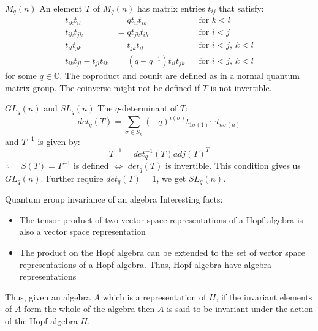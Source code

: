 \documentclass[pdf,colorBG,slideColor,fyma]{prosper}
\def\IC{\mathbb{C}}
\begin{document}
\begin{slide}{$M_q(n)$}
An element $T$ of $M_q(n)$ has matrix entries $t_{ij}$ that satisfy:
\begin{align*}
t_{ik} t_{il} & = q t_{il} t_{ik} & &\text{for $k < l$} \\
t_{ik} t_{jk} & = q t_{jk} t_{ik} & &\text{for $i < j$} \\
t_{il} t_{jk} & = t_{jk} t_{il} & &\text{for $i  < j$, $k < l$} \\
t_{ik} t_{jl} - t_{jl} t_{ik} & = (q - q^{-1}) t_{il} t_{jk} & &\text{for $i  < j$, $k < l$}
\end{align*}
for some $q \in \IC$.
\break
\break
The coproduct and counit are defined as in a normal quantum matrix group.
\break
\break
The coinverse might not be defined if $T$ is not invertible.

\end{slide}


\begin{slide}{$GL_q(n)$ and $SL_q(n)$}
The $q$-determinant of $T$:
\[
det_q(T) = \sum_{\sigma \in S_n} (-q)^{i(\sigma)} t_{1\sigma(1)} \cdots t_{n\sigma(n)}
\]
and $T^{-1}$ is given by:
\[
T^{-1} = det_q^{-1}(T) adj(T)^T
\]
$\therefore\quad$ $S(T) = T^{-1}$ is defined $\Leftrightarrow$ $det_q(T)$ is invertible.
\break
\break
This condition gives us $GL_q(n)$.
\break
\break
Further require $det_q(T) = 1$, we get $SL_q(n)$.
\end{slide}


\begin{slide}{Quantum group invariance of an algebra}
Interesting facts:
\begin{itemize}
  \item{The tensor product of two vector space representations of a Hopf algebra is also
    a vector space representation}
  \item{The product on the Hopf algebra can be extended to the set of vector space
    representations of a Hopf algebra. Thus, Hopf algebra have algebra representations}
\end{itemize}

Thus, given an algebra $A$ which is a representation of $H$, if the invariant elements of $A$ form the
whole of the algebra then $A$ is said to be invariant under the action of the Hopf algebra $H$.
\end{slide}
\end{document}
